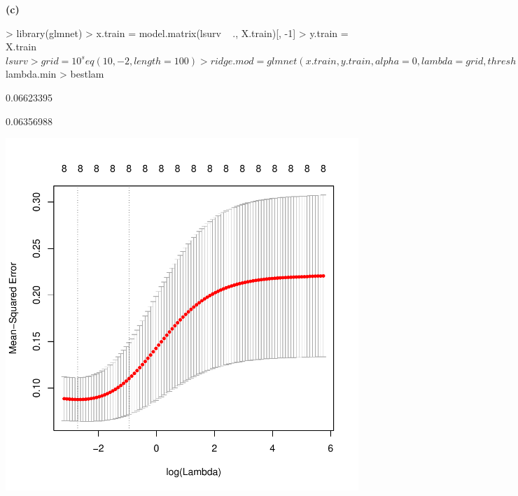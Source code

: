 \documentclass[a4paper]{article}
\renewcommand{\part}[1] {\vspace{.10in} {\bf (#1)}}
\begin{document}
\part{c}
\begin{Schunk}
\begin{Sinput}
> library(glmnet)
> x.train = model.matrix(lsurv ~ ., X.train)[, -1]
> y.train = X.train$lsurv
> grid = 10 ^ seq(10, -2, length = 100)
> ridge.mod = glmnet(x.train, y.train, alpha = 0, lambda = grid, thresh = 1e-12)
> cv.out = cv.glmnet(x.train, y.train, alpha = 0, nfolds = 10)
> plot(cv.out)
> bestlam = cv.out$lambda.min
> bestlam
\end{Sinput}
\begin{Soutput}
[1] 0.06623395
\end{Soutput}
\begin{Soutput}
[1] 0.06356988
\end{Soutput}
\end{Schunk}
\includegraphics{crossvalidation-99c}
\end{document}
